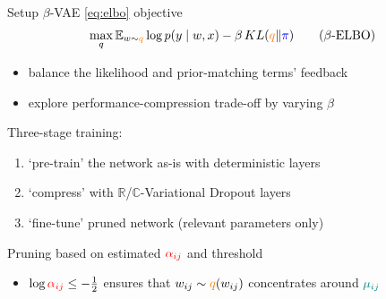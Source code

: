 \documentclass{beamer}
\newcommand{\real}{\mathbb{R}}
\newcommand{\cplx}{\mathbb{C}}
\begin{document}
\begin{frame}[c]{Setup}{\insertsection}
  $\beta$-VAE \ref{eq:elbo} objective {\tiny \citep{higgins_beta-vae_2017}}
  \begin{equation}
  \label{eq:beta_elbo}
    \max_q
    \mathbb{E}_{w \sim {\color{orange} q}}
      \log p(y\mid w, x)  %
    - \beta \mathop{KL}({\color{orange} q}\|{\color{blue} \pi})
    \tag{$\beta$-ELBO}
  \end{equation}
  \vspace{-1em}
  \begin{itemize}
    \item balance the likelihood and prior-matching terms' feedback
    \item explore performance-compression trade-off by varying $\beta$
  \end{itemize}

  \bigskip
  Three-stage training:
  \begin{enumerate}
    \item `pre-train' the network as-is with deterministic layers
    \item `compress' with $\real$/$\cplx$-Variational Dropout layers
    \item `fine-tune' pruned network (relevant parameters only)
  \end{enumerate}

  \bigskip
  Pruning based on estimated ${\color{red} \alpha_{ij}}$ and threshold
  \begin{itemize}
    \item $
      \log{{\color{red} \alpha_{ij}}} \leq -\tfrac12
    $ ensures that $
      w_{ij} \sim {\color{orange} q}(w_{ij})
    $ concentrates around ${\color{teal} \mu_{ij}}$
  \end{itemize}
\end{frame}

\end{document}
